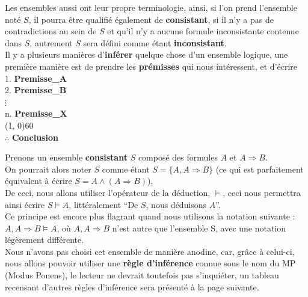 \documentclass[a4paper, 12pt]{article}
\newcommand{\imply}{\Rightarrow}
\numberwithin{equation}{subsection}
\begin{document}
  Les ensembles aussi ont leur propre terminologie, ainsi, si l'on prend l'ensemble noté $S$, il pourra être qualifié également de {\bf consistant}, si il n'y a pas de contradictions au sein de $S$ et qu'il n'y a aucune formule inconsistante contenue dans $S$, autrement $S$ sera défini comme étant {\bf inconsistant}. \\[0.5cm]
  Il y a plusieurs manières d'{\bf inférer} quelque chose d'un ensemble logique, une première manière est de prendre les {\bf prémisses} qui nous intéressent, et d'écrire \\[0.5cm]
    1. {\bf Premisse\_A} \\
    2. {\bf Premisse\_B} \\
    \hspace{0.2cm}$\vdots$ \\
    n. {\bf Premisse\_X} \\
    \hspace{0.5cm}\line(1, 0){60} \\
    $\therefore$ {\bf Conclusion} \

    Prenons un ensemble {\bf consistant} $S$ composé des formules $A$ et $A \imply B$. \\

    On pourrait alors noter $S$ comme étant $S = \{ A, A \imply B \}$ (ce qui est parfaitement équivalent à écrire $S = A \land (A \imply B)$), \\

    De ceci, nous allons utiliser l'opérateur de la déduction, $\vDash$, ceci nous permettra ainsi écrire $S \vDash A$, littéralement ``De $S$, nous déduisons $A$''. \\

    Ce principe est encore plus flagrant quand nous utilisons la notation suivante : $A, A \imply B \models A$, où $A, A \imply B$ n'est autre que l'ensemble S, avec une notation légèrement différente. \\

    Nous n'avons pas choisi cet ensemble de manière anodine, car, grâce à celui-ci, nous allons pouvoir utiliser une {\bf règle d'inférence} connue sous le nom du MP (Modus Ponens), le lecteur ne devrait toutefois pas s'inquiéter, un tableau recensant d'autres règles d'inférence sera présenté à la page suivante. \\
\end{document}
